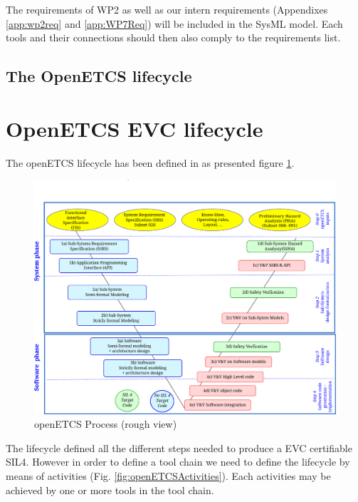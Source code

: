 The requirements of WP2 \cite{baro_requirements_2013} as well as our
intern requirements (Appendixes \ref{app:wp2req} and \ref{app:WP7Req})
will be included in the SysML model. Each tools and their connections
should then also comply to the requirements list.


\subsection{The OpenETCS lifecycle}
\section{OpenETCS \gls{EVC} lifecycle}
The openETCS lifecycle has been defined in 
 \cite{D2.3} as  presented figure \ref{fig:openETCSProcess}.
\begin{figure}[htbp]
  \centering
  \includegraphics[width= \textwidth]{images/ProcessOpenETCS}
  \caption{openETCS Process (rough view)}
  \label{fig:openETCSProcess}
\end{figure}

The lifecycle defined all the different steps needed to produce a
\gls{EVC} certifiable SIL4. However in order to define a tool chain we
need to define the lifecycle by means of activities
(Fig. \ref{fig:openETCSActivities}). Each activities may be achieved by
one or more tools in the tool chain. 

